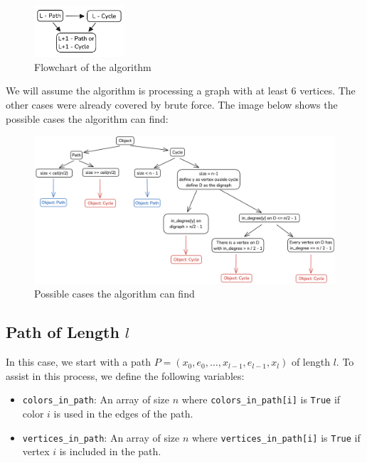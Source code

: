 \begin{figure}[H]
    \centering
    \includegraphics[width=0.3\textwidth]{figuras/flowchart.png}
    \caption{Flowchart of the algorithm}
    \label{fig:flowchart}
\end{figure}

We will assume the algorithm is processing a graph with at
least $6$ vertices. The other cases were already covered by brute force.
The image below shows the possible cases the algorithm can find:

\begin{figure}[H]
    \centering
    \includegraphics[width=1\textwidth]{figuras/flowchart_case.png}
    \caption{Possible cases the algorithm can find}
    \label{fig:flowchart_cases}
\end{figure}

\subsection{Path of Length \( l \)}

In this case, we start with a path \( P = (x_0, e_0, \dots, x_{l-1}, e_{l-1}, x_{l}) \) of length \( l \). 
To assist in this process, we define the following variables:

\begin{itemize}
    \item \texttt{colors\_in\_path}: An array of size \( n \) where \texttt{colors\_in\_path[i]} is \texttt{True} if color \( i \) is used in the edges of the path.
    \item \texttt{vertices\_in\_path}: An array of size \( n \) where \texttt{vertices\_in\_path[i]} is \texttt{True} if vertex \( i \) is included in the path.
\end{itemize}

